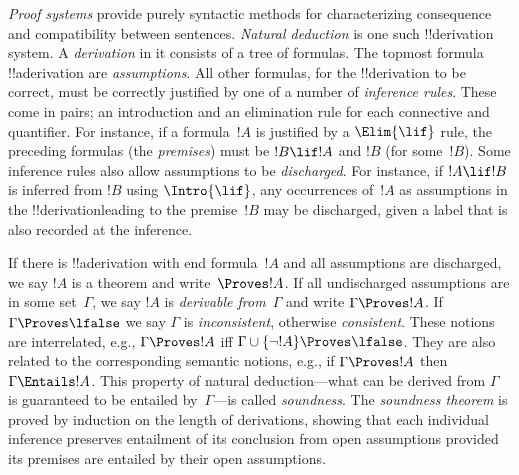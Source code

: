 \emph{Proof systems} provide purely syntactic methods for
characterizing consequence and compatibility between sentences.
\emph{Natural deduction} is one such !!{derivation} system. A \emph{derivation}
in it consists of a tree of formulas. The topmost formula !!a{derivation}
are \emph{assumptions}. All other formulas, for the !!{derivation} to be
correct, must be correctly justified by one of a number of
\emph{inference rules}. These come in pairs; an introduction and an
elimination rule for each connective and quantifier. For instance, if
a formula~$!A$ is justified by a $\Elim{\lif}$ rule, the preceding
formulas (the \emph{premises}) must be $!B \lif !A$ and $!B$ (for
some~$!B$). Some inference rules also allow assumptions to be
\emph{discharged}. For instance, if $!A \lif !B$ is inferred from $!B$
using $\Intro{\lif}$, any occurrences of~$!A$ as assumptions in the
!!{derivation}leading to the premise~$!B$ may be discharged, given a
label that is also recorded at the inference.

If there is !!a{derivation} with end formula~$!A$ and all assumptions are
discharged, we say $!A$ is a theorem and write~$\Proves !A$. If all
undischarged assumptions are in some set~$\Gamma$, we say $!A$ is
\emph{derivable from}~$\Gamma$ and write $\Gamma \Proves !A$. If
$\Gamma \Proves \lfalse$ we say $\Gamma$ is \emph{inconsistent},
otherwise \emph{consistent}. These notions are interrelated, e.g.,
$\Gamma \Proves !A$ iff $\Gamma \cup \{\lnot !A\} \Proves
\lfalse$. They are also related to the corresponding semantic notions,
e.g., if $\Gamma \Proves !A$ then $\Gamma \Entails !A$. This property
of natural deduction---what can be derived from $\Gamma$ is guaranteed
to be entailed by~$\Gamma$---is called \emph{soundness}. The
\emph{soundness theorem} is proved by induction on the length of
derivations, showing that each individual inference preserves
entailment of its conclusion from open assumptions provided its premises are
entailed by their open assumptions.
